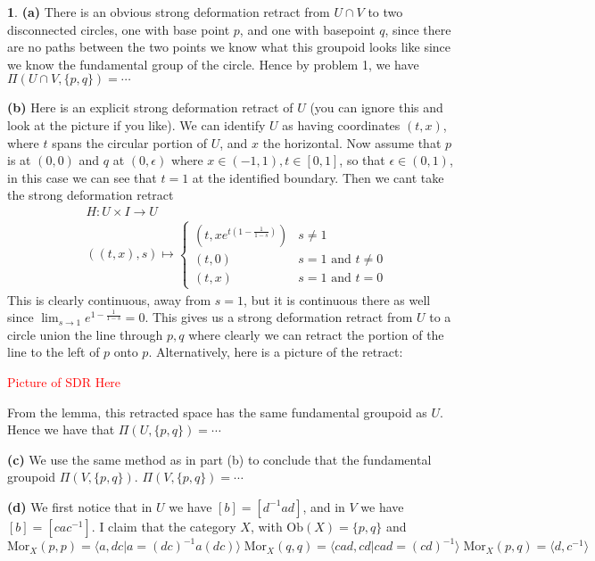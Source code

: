 \documentclass[10.5pt]{article}
\theoremstyle{definition}
\newtheorem{pb}{}
\newcommand{\set}[1]{\{#1\}}
\newcommand{\gen}[1]{\langle #1 \rangle}
\newcommand{\tand}{\text{ and }}
\begin{document}
    \begin{pb}
        \textbf{(a)} There is an obvious strong deformation retract from \(U \cap V\) to two disconnected circles, one with base point \(p\), and one with basepoint
        \(q\), since there are no paths between the two points we know what this groupoid looks like since we know the fundamental group of the circle.
        Hence by problem 1, we have \(\Pi(U \cap V, \set{p,q}) = \cdots\)

        \textbf{(b)} Here is an explicit strong deformation retract of \(U\) (you can ignore this and look at the picture if you like).
        We can identify \(U\) as having coordinates \((t,x)\), where \(t\) spans the circular portion of \(U\),
        and \(x\) the horizontal. Now assume that \(p\) is at \((0,0)\) and \(q\) at \((0,\epsilon)\) where \(x \in (-1,1), t \in [0,1]\), so that \(\epsilon \in (0,1)\), in this case
        we can see that \(t = 1\) at the identified boundary. Then we cant take the strong deformation retract
        \begin{align*}
            &H: U \times I \to U \\
            &((t,x),s) \mapsto \begin{cases}
                (t,xe^{t(1-\frac{1}{1-s})}) & s \neq 1\\
                (t,0) & s = 1 \tand t \neq 0 \\
                (t,x) & s = 1 \tand t = 0
            \end{cases}
        \end{align*}
        This is clearly continuous, away from \(s = 1\), but it is continuous there as well since \(\lim_{s\to1}e^{1-\frac{1}{1-s}} = 0\). This gives us a strong deformation 
        retract from \(U\) to a circle union the line through \(p,q\) where clearly we can retract the portion of the line to the left of \(p\) onto \(p\). Alternatively, here is a picture of the
        retract:
            
        \textcolor{red}{Picture of SDR Here}

        From the lemma, this retracted space has the same fundamental groupoid as \(U\). Hence we have that
        \(\Pi(U,\set{p,q}) = \cdots\)

        \textbf{(c)} We use the same method as in part (b) to conclude that the fundamental groupoid \(\Pi(V, \set{p,q})\).
        \(\Pi(V, \set{p,q}) = \cdots\)

        \textbf{(d)} We first notice that in \(U\) we have \([b] = [d^{-1}ad]\), and in \(V\) we have \([b] = [cac^{-1}]\). I claim that the category \(X\), with
        \(\text{Ob}(X) = \set{p,q}\) and
        \[\text{Mor}_X(p,p) = \gen{a,dc \vert a = (dc)^{-1}a(dc)} \; \text{Mor}_X(q,q) = \gen{cad, cd \vert cad = (cd)^{-1}} \; \text{Mor}_X(p,q) = \gen{d,c^{-1}}\]
    \end{pb}
\end{document}
